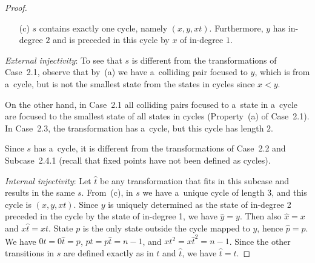 \documentclass{amsart}
\newcommand{\e}[1]{\hat{#1}}
\begin{document}
\begin{proof}
\begin{enumerate}
\item[(c)] $s$ contains exactly one cycle, namely $(x,y,xt)$.
Furthermore, $y$ has in-degree $2$ and is preceded in this cycle by $x$ of in-degree $1$.
\end{enumerate}

\textit{External injectivity}:
To see that $s$ is different from the transformations of Case~2.1, observe that by~(a) we have a~colliding pair focused to $y$, which is from a~cycle, but is not the smallest state from the states in cycles since $x < y$.

On the other hand, in Case~2.1 all colliding pairs focused to a~state in a~cycle are focused to the smallest state of all states in cycles (Property~(a) of Case~2.1). In Case~2.3, the transformation has a~cycle, but this cycle has length $2$.

Since $s$ has a~cycle, it is different from the transformations of Case~2.2 and Subcase~2.4.1 (recall that fixed points have not been defined as cycles).

\textit{Internal injectivity}:
Let $\e{t}$ be any transformation that fits in this subcase and results in the same $s$.
From~(c), in $s$ we have a~unique cycle of length 3, and this cycle is $(x,y,xt)$.
Since $y$ is uniquely determined as the state of in-degree 2 preceded in the cycle by the state of in-degree 1, we have $\e{y} = y$.
Then also $\e{x} = x$ and $x\e{t} = xt$. State $p$ is the only state outside the cycle mapped to $y$, hence $\e{p} = p$.
We have $0t = 0\e{t} = p$, $pt = p\e{t} = n-1$, and $xt^2 = x{\e{t}}^2 = n-1$.
Since the other transitions in $s$ are defined exactly as in $t$ and $\e{t}$, we have $\e{t} = t$.


\end{proof}
\end{document}
